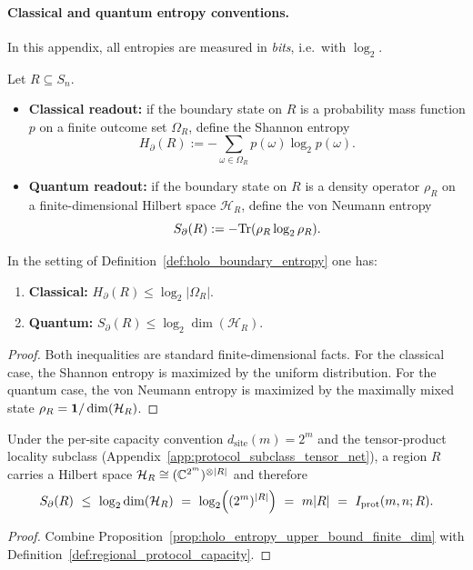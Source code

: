 \paragraph{Classical and quantum entropy conventions.}
In this appendix, all entropies are measured in \emph{bits}, i.e.\ with $\log_2$.

\begin{definition}
\label{def:holo_boundary_entropy}
\MathTag Let $R\subseteq S_n$.
\begin{itemize}
\item \textbf{Classical readout:} if the boundary state on $R$ is a probability mass function $p$ on a finite outcome set
$\Omega_R$, define the Shannon entropy
\[
H_{\partial}(R):=-\sum_{\omega\in\Omega_R} p(\omega)\log_2 p(\omega).
\]
\item \textbf{Quantum readout:} if the boundary state on $R$ is a density operator $\rho_R$ on a finite-dimensional Hilbert space
$\mathcal{H}_R$, define the von Neumann entropy
\[
S_{\partial}(R):=-\mathrm{Tr}(\rho_R\log_2\rho_R).
\]
\end{itemize}
\end{definition}

\begin{proposition}
\label{prop:holo_entropy_upper_bound_finite_dim}
\MathTag In the setting of Definition~\ref{def:holo_boundary_entropy} one has:
\begin{enumerate}
\item \textbf{Classical:} $H_{\partial}(R)\le \log_2|\Omega_R|$.
\item \textbf{Quantum:} $S_{\partial}(R)\le \log_2\dim(\mathcal{H}_R)$.
\end{enumerate}
\end{proposition}
\begin{proof}
Both inequalities are standard finite-dimensional facts.
For the classical case, the Shannon entropy is maximized by the uniform distribution.
For the quantum case, the von Neumann entropy is maximized by the maximally mixed state $\rho_R=\mathbf{1}/\dim(\mathcal{H}_R)$.
\end{proof}

\begin{corollary}
\label{cor:holo_protocol_capacity_bound}
\InterfaceTag Under the per-site capacity convention $d_{\mathrm{site}}(m)=2^m$ and the tensor-product locality subclass
(Appendix~\ref{app:protocol_subclass_tensor_net}), a region $R$ carries a Hilbert space
$\mathcal{H}_R\cong (\mathbb{C}^{2^m})^{\otimes |R|}$ and therefore
\[
S_{\partial}(R)\ \le\ \log_2\dim(\mathcal{H}_R)\ =\ \log_2\Bigl((2^m)^{|R|}\Bigr)\ =\ m|R|\ =\ I_{\mathrm{prot}}(m,n;R).
\]
\end{corollary}
\begin{proof}
Combine Proposition~\ref{prop:holo_entropy_upper_bound_finite_dim} with Definition~\ref{def:regional_protocol_capacity}.
\end{proof}


